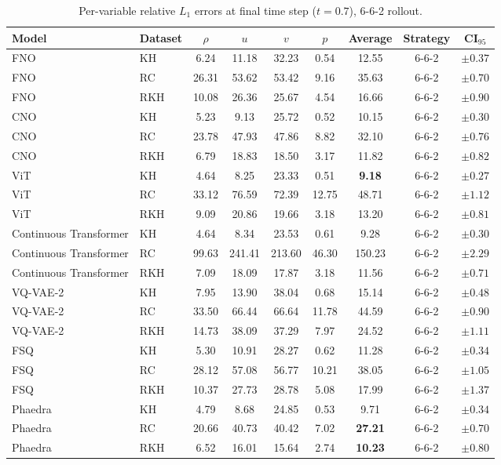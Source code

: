 \begin{table}[h]
    \centering
    \caption{Per-variable relative $L_1$ errors at final time step ($t=0.7$), 6-6-2 rollout.}
    \begin{tabular}{llccccccc}
        \toprule
        Model & Dataset  & $\rho$ & $u$ & $v$ & $p$ & Average & Strategy & CI$_{95}$ \\
        \midrule
        FNO & KH & 6.24 & 11.18 & 32.23 & 0.54 & 12.55 & 6-6-2 & $\pm0.37$ \\
        FNO & RC & 26.31 & 53.62 & 53.42 & 9.16 & 35.63 & 6-6-2 & $\pm0.70$ \\
        FNO & RKH & 10.08 & 26.36 & 25.67 & 4.54 & 16.66 & 6-6-2 & $\pm0.90$ \\
        \midrule
        CNO & KH & 5.23 & 9.13 & 25.72 & 0.52 & 10.15 & 6-6-2 & $\pm0.30$ \\
        CNO & RC & 23.78 & 47.93 & 47.86 & 8.82 & 32.10 & 6-6-2 & $\pm0.76$ \\
        CNO & RKH & 6.79 & 18.83 & 18.50 & 3.17 & 11.82 & 6-6-2 & $\pm0.82$ \\
        \midrule
        ViT & KH & 4.64 & 8.25 & 23.33 & 0.51 & \textbf{9.18} & 6-6-2 & $\pm0.27$ \\
        ViT & RC & 33.12 & 76.59 & 72.39 & 12.75 & 48.71 & 6-6-2 & $\pm1.12$ \\
        ViT & RKH & 9.09 & 20.86 & 19.66 & 3.18 & 13.20 & 6-6-2 & $\pm0.81$ \\
        \midrule
        Continuous Transformer & KH & 4.64 & 8.34 & 23.53 & 0.61 & 9.28 & 6-6-2 & $\pm0.30$ \\
        Continuous Transformer & RC & 99.63 & 241.41 & 213.60 & 46.30 & 150.23 & 6-6-2 & $\pm2.29$ \\
        Continuous Transformer & RKH & 7.09 & 18.09 & 17.87 & 3.18 & 11.56 & 6-6-2 & $\pm0.71$ \\
        \midrule
        VQ-VAE-2 & KH & 7.95 & 13.90 & 38.04 & 0.68 & 15.14 & 6-6-2 & $\pm0.48$ \\
        VQ-VAE-2 & RC & 33.50 & 66.44 & 66.64 & 11.78 & 44.59 & 6-6-2 & $\pm0.90$ \\
        VQ-VAE-2 & RKH & 14.73 & 38.09 & 37.29 & 7.97 & 24.52 & 6-6-2 & $\pm1.11$ \\
        \midrule
        FSQ & KH & 5.30 & 10.91 & 28.27 & 0.62 & 11.28 & 6-6-2 & $\pm0.34$ \\
        FSQ & RC & 28.12 & 57.08 & 56.77 & 10.21 & 38.05 & 6-6-2 & $\pm1.05$ \\
        FSQ & RKH & 10.37 & 27.73 & 28.78 & 5.08 & 17.99 & 6-6-2 & $\pm1.37$ \\
        \midrule
        Phaedra & KH & 4.79 & 8.68 & 24.85 & 0.53 & 9.71 & 6-6-2 & $\pm0.34$ \\
        Phaedra & RC & 20.66 & 40.73 & 40.42 & 7.02 & \textbf{27.21} & 6-6-2 & $\pm0.70$ \\
        Phaedra & RKH & 6.52 & 16.01 & 15.64 & 2.74 & \textbf{10.23} & 6-6-2 & $\pm0.80$ \\
        \bottomrule
    \end{tabular}
\end{table}
